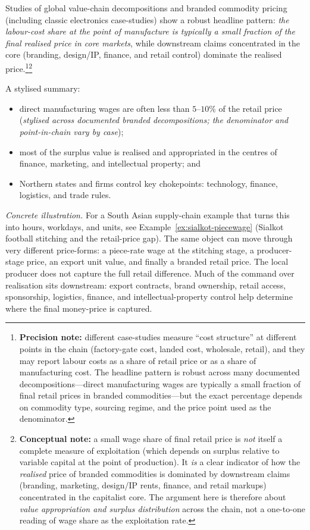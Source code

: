 Studies of global value-chain decompositions and branded commodity pricing (including classic electronics case-studies)\cite{Smith2016,Hickel2022,DedrickKraemerLinden2010}
show a robust headline pattern: \emph{the labour-cost share at the point of manufacture is typically a small fraction of the final realised price in core markets},
while downstream claims concentrated in the core (branding, design/IP, finance, and retail control) dominate the realised price.\footnote{\textbf{Precision note:}
different case-studies measure ``cost structure'' at different points in the chain (factory-gate cost, landed cost, wholesale, retail), and they may report
labour costs as a share of retail price or as a share of manufacturing cost. The headline pattern is robust across many documented decompositions---direct
manufacturing wages are typically a small fraction of final retail prices in branded commodities---but the exact percentage depends on commodity type, sourcing
regime, and the price point used as the denominator.}\footnote{\textbf{Conceptual note:}
a small wage share of final retail price is \emph{not} itself a complete measure of exploitation (which depends on surplus relative to variable capital at the
point of production). It \emph{is} a clear indicator of how the \emph{realised} price of branded commodities is dominated by downstream claims (branding,
marketing, design/IP rents, finance, and retail markups) concentrated in the capitalist core. The argument here is therefore about \emph{value appropriation
and surplus distribution} across the chain, not a one-to-one reading of wage share as the exploitation rate.}

A stylised summary:

\begin{itemize}[leftmargin=1.5em]
  \item direct manufacturing wages are often less than \(5\)–\(10\%\) of the retail price
  (\emph{stylised across documented branded decompositions; the denominator and point-in-chain vary by case});
  \item most of the surplus value is realised and appropriated in the centres of finance, marketing, and intellectual property; and
  \item Northern states and firms control key chokepoints: technology, finance, logistics, and trade rules.\cite{Smith2016,Hickel2022}
\end{itemize}

\noindent\textit{Concrete illustration.} For a South Asian supply-chain example that turns this into
hours, workdays, and units, see Example~\ref{ex:sialkot-piecewage} (Sialkot
football stitching and the retail-price gap). The same object can move through
very different price-forms: a piece-rate wage at the stitching stage, a
producer-stage price, an export unit value, and finally a branded retail price.
The local producer does not capture the full retail difference. Much of the command
over realisation sits downstream: export contracts, brand ownership, retail access,
sponsorship, logistics, finance, and intellectual-property control help determine
where the final money-price is captured.

